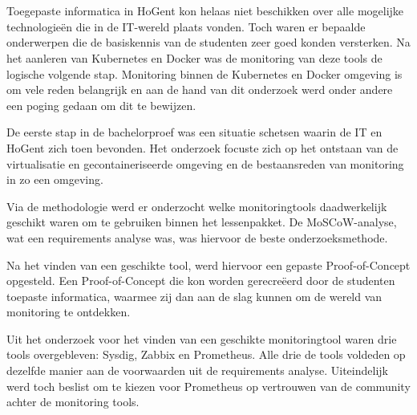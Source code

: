 
\chapter*{}

Toegepaste informatica in HoGent kon helaas niet beschikken over alle mogelijke technologieën die in de IT-wereld plaats vonden. Toch waren er bepaalde onderwerpen die de basiskennis van de studenten zeer goed konden versterken. Na het aanleren van Kubernetes en Docker was de monitoring van deze tools de logische volgende stap. Monitoring binnen de Kubernetes en Docker omgeving is om vele reden belangrijk en aan de hand van dit onderzoek werd onder andere een poging gedaan om dit te bewijzen.

De eerste stap in de bachelorproef was een situatie schetsen waarin de IT en HoGent zich toen bevonden. Het onderzoek focuste zich op het ontstaan van de virtualisatie en gecontaineriseerde omgeving en de bestaansreden van monitoring in zo een omgeving. 

Via de methodologie werd er onderzocht welke monitoringtools daadwerkelijk geschikt waren om te gebruiken binnen het lessenpakket. De MoSCoW-analyse, wat een requirements analyse was, was hiervoor de beste onderzoeksmethode. 

Na het vinden van een geschikte tool, werd hiervoor een gepaste Proof-of-Concept opgesteld. Een Proof-of-Concept die kon worden gerecreëerd door de studenten toepaste informatica, waarmee zij dan aan de slag kunnen om de wereld van monitoring te ontdekken. 

Uit het onderzoek voor het vinden van een geschikte monitoringtool waren drie tools overgebleven: Sysdig, Zabbix en Prometheus. Alle drie de tools voldeden op dezelfde manier aan de voorwaarden uit de requirements analyse. Uiteindelijk werd toch beslist om te kiezen voor Prometheus op vertrouwen van de community achter de monitoring tools. 